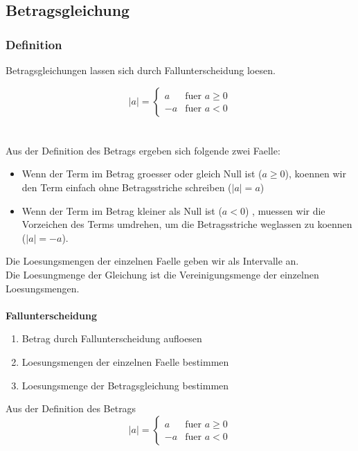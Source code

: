 \begin{multicols}{2}
    \subsection{Betragsgleichung}
    \vspace{-4mm}
    \subsubsection{Definition}
    \vspace{-4mm}
    Betragsgleichungen lassen sich durch Fallunterscheidung loesen.

    \begin{equation*} |a| = \begin{cases} a &\text{fuer } a \geq 0 \\[5px] -a &\text{fuer } a < 0 \end{cases} \end{equation*}\\~\\
    Aus der Definition des Betrags ergeben sich folgende zwei Faelle: \\
    \begin{itemize}
        \item Wenn der Term im Betrag groesser oder gleich Null ist ($a \geq 0$), koennen wir den Term einfach ohne Betragsstriche schreiben ($|a| = a$)
        \item Wenn der Term im Betrag kleiner als Null ist ($a < 0$) , muessen wir die Vorzeichen des Terms umdrehen, um die Betragsstriche weglassen zu koennen ($|a| = -a$).
    \end{itemize}
    Die Loesungsmengen der einzelnen Faelle geben wir als Intervalle an. \\
    Die Loesungmenge der Gleichung ist die Vereinigungsmenge der einzelnen Loesungsmengen.\\~\\
    \textbf{Fallunterscheidung}
    \begin{enumerate}
        \item Betrag durch Fallunterscheidung aufloesen
        \item Loesungsmengen der einzelnen Faelle bestimmen
        \item Loesungsmenge der Betragsgleichung bestimmen
    \end{enumerate}
    Aus der Definition des Betrags
    \begin{equation*} |a| = \begin{cases} a &\text{fuer } a \geq 0 \\[5px] -a &\text{fuer } a < 0 \end{cases} \end{equation*}\

\end{multicols}

